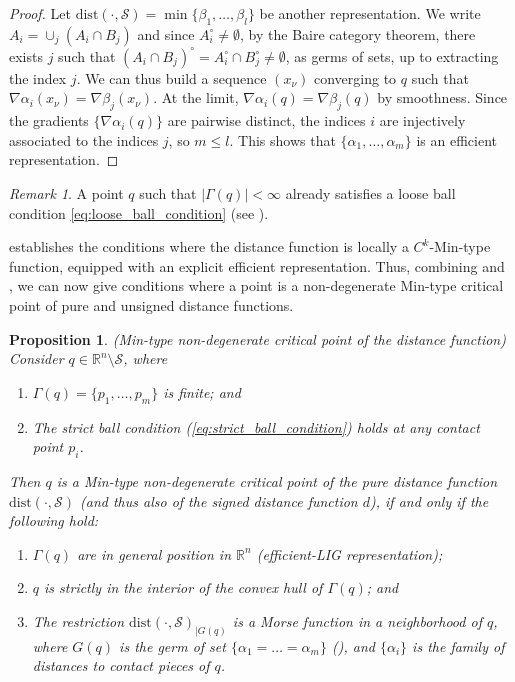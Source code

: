 \documentclass[11pt]{article}
\newcommand{\R}{\mathbb{R}}
\newcommand{\inter}{\cap}
\newcommand{\union}{\cup}
\newcommand{\dist}{\mathrm{dist}}
\newcommand{\Surf}{\mathcal{S}}
\newcommand{\grad}{\nabla}
\theoremstyle{plain}
\newtheorem{prop}{Proposition}
\theoremstyle{definition}
\theoremstyle{remark}
\newtheorem{rmk}{Remark}
\begin{document}
\begin{proof}
		Let $\dist(\cdot, \Surf) = \min \{\beta_1,\ldots,\beta_l\}$ be another representation. We write $A_i = \union_j (A_i \inter B_j)$ and since $A_i^\circ \neq \emptyset$, by the Baire category theorem, there exists $j$ such that $(A_i \inter B_j)^\circ = A_i^\circ \inter B_j^\circ \neq \emptyset$, as germs of sets, up to extracting the index $j$. We can thus build a sequence $(x_\nu)$ converging to $q$ such that $\grad \alpha_i(x_\nu) = \grad \beta_j(x_\nu)$. At the limit, $\grad \alpha_i(q) = \grad \beta_j(q)$ by smoothness. Since the gradients $\{\grad \alpha_i(q) \}$ are pairwise distinct, the indices $i$ are injectively associated to the indices $j$, so $m \leq l$.
		This shows that $\{\alpha_1,\ldots,\alpha_m\}$ is an efficient representation.
	\end{proof}
	
	\begin{rmk}
		
		A point $q$ such that $|\Gamma(q)| < \infty$ already satisfies a loose ball condition \eqref{eq:loose_ball_condition}
		(see \cite[Proposition 6.1]{niyogi_finding_2008}).
	\end{rmk}
	
	 establishes the conditions where the distance function is locally a $C^k$-Min-type function, equipped with an explicit efficient representation. Thus,  combining   and , we can now give conditions where a point is a non-degenerate Min-type critical point of pure and unsigned distance functions. 
	
	\begin{prop}(Min-type non-degenerate critical point of the distance function)
		\label{def:ndg_crit_dist}
		Consider $q \in \R^n \setminus \Surf$, where
		\begin{enumerate}[label=(N\arabic*), ref=(N\arabic*), start=1]
			\item $\Gamma(q) = \{p_1,\ldots,p_m\}$ is finite; and \label{def:NDGC_Finite}
			\item The strict ball condition (\cref{eq:strict_ball_condition}) holds at any contact point $p_i$. \label{def:NDGC_StrictBall}
		\end{enumerate}
		Then $q$ is a \emph{Min-type non-degenerate critical point of the pure distance function $\dist(\cdot, \Surf)$} (and thus also of the signed distance function $d$), if and only if the following hold:
		\begin{enumerate}[label=(N3\alph*), ref=(N3\alph*)]
			\item $\Gamma(q)$ are in general position in $\R^n$ (efficient-LIG representation);\label{def:NDGC_LIG}
			\item $q$ is strictly in the interior of the convex hull of $\Gamma(q)$; and\label{def:NDGC_Convex} 
			\item The restriction $\dist(\cdot, \Surf)_{|G(q)}$ is a Morse function in a neighborhood of $q$, where $G(q)$ is the germ of set $\{\alpha_1 = \ldots = \alpha_m\}$ (), and  $\{\alpha_i\}$ is the family of distances to contact pieces of $q$. \label{def:NDGC_MorseGerm}
		\end{enumerate}
	\end{prop}
	
\end{document}
